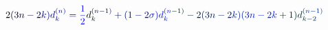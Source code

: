\documentclass[12pt]{article}
\begin{document}
\makeatletter
\renewcommand*{\@textcolor}[3]{%
  \protect\leavevmode
  \begingroup
    \color#1{#2}#3%
  \endgroup
}
\makeatother
\begin{displaymath}
\mathcolor[RGB]{0,0,15}{2} \mathcolor[RGB]{0,0,30}{(} \mathcolor[RGB]{0,0,45}{3} \mathcolor[RGB]{0,0,60}{n} \mathcolor[RGB]{0,0,75}{-} \mathcolor[RGB]{0,0,90}{2} \mathcolor[RGB]{0,0,105}{k} \mathcolor[RGB]{0,0,120}{)} \mathcolor[RGB]{0,0,135}{d} _ { \mathcolor[RGB]{0,0,150}{k} } ^ { \mathcolor[RGB]{0,0,165}{(} \mathcolor[RGB]{0,0,180}{n} \mathcolor[RGB]{0,0,195}{)} } \mathcolor[RGB]{0,0,210}{=} \mathcolor[RGB]{0,0,225}{\frac { \mathcolor[RGB]{0,0,240}{1} } { \mathcolor[RGB]{0,0,255}{2} } } \mathcolor[RGB]{0,15,0}{d} _ { \mathcolor[RGB]{0,15,15}{k} } ^ { \mathcolor[RGB]{0,15,30}{(} \mathcolor[RGB]{0,15,45}{n} \mathcolor[RGB]{0,15,60}{-} \mathcolor[RGB]{0,15,75}{1} \mathcolor[RGB]{0,15,90}{)} } \mathcolor[RGB]{0,15,105}{+} \mathcolor[RGB]{0,15,120}{(} \mathcolor[RGB]{0,15,135}{1} \mathcolor[RGB]{0,15,150}{-} \mathcolor[RGB]{0,15,165}{2} \mathcolor[RGB]{0,15,180}{\sigma} \mathcolor[RGB]{0,15,195}{)} \mathcolor[RGB]{0,15,210}{d} _ { \mathcolor[RGB]{0,15,225}{k} } ^ { \mathcolor[RGB]{0,15,240}{(} \mathcolor[RGB]{0,15,255}{n} \mathcolor[RGB]{0,30,0}{-} \mathcolor[RGB]{0,30,15}{1} \mathcolor[RGB]{0,30,30}{)} } \mathcolor[RGB]{0,30,45}{-} \mathcolor[RGB]{0,30,60}{2} \mathcolor[RGB]{0,30,75}{(} \mathcolor[RGB]{0,30,90}{3} \mathcolor[RGB]{0,30,105}{n} \mathcolor[RGB]{0,30,120}{-} \mathcolor[RGB]{0,30,135}{2} \mathcolor[RGB]{0,30,150}{k} \mathcolor[RGB]{0,30,165}{)} \mathcolor[RGB]{0,30,180}{(} \mathcolor[RGB]{0,30,195}{3} \mathcolor[RGB]{0,30,210}{n} \mathcolor[RGB]{0,30,225}{-} \mathcolor[RGB]{0,30,240}{2} \mathcolor[RGB]{0,30,255}{k} \mathcolor[RGB]{0,45,0}{+} \mathcolor[RGB]{0,45,15}{1} \mathcolor[RGB]{0,45,30}{)} \mathcolor[RGB]{0,45,45}{d} _ { \mathcolor[RGB]{0,45,60}{k} \mathcolor[RGB]{0,45,75}{-} \mathcolor[RGB]{0,45,90}{2} } ^ { \mathcolor[RGB]{0,45,105}{(} \mathcolor[RGB]{0,45,120}{n} \mathcolor[RGB]{0,45,135}{-} \mathcolor[RGB]{0,45,150}{1} \mathcolor[RGB]{0,45,165}{)} } \,
\end{displaymath}
\end{document}
